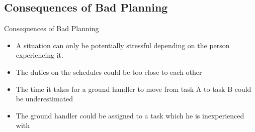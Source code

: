 \subsection{Consequences of Bad Planning}
\begin{frame}{Consequences of Bad Planning}{}
    \begin{itemize}
        \item A situation can only be potentially stressful depending on the person experiencing it.
        \item The duties on the schedules could be too close to each other
        \item The time it takes for a ground handler to move from task A to task B could be underestimated
        \item The ground handler could be assigned to a task which he is inexperienced with
    \end{itemize}
\end{frame}
